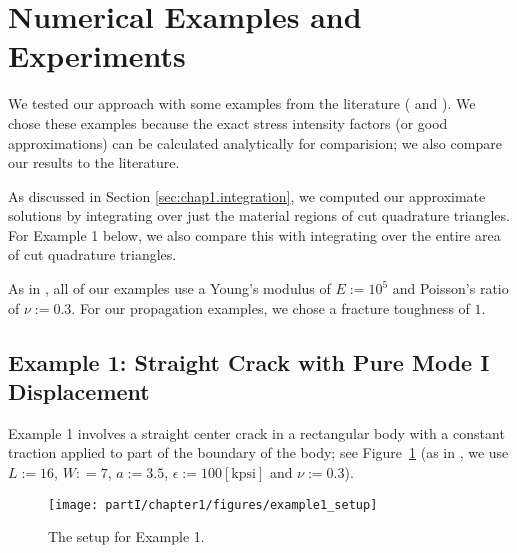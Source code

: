\section{Numerical Examples and Experiments} \label{sec:chap1.examples}

We tested our approach with some examples from the literature 
(\cite{Belytschko99} and \cite{Moes99}). We chose these examples because the exact stress intensity factors (or good approximations) can be calculated analytically for comparision; we also compare our results to the literature.

As discussed in Section \ref{sec:chap1.integration}, we computed our approximate solutions by integrating over just the material regions of cut quadrature triangles. For Example 1 below, we also compare this with integrating over the entire area of cut quadrature triangles.

As in \cite{Moes99}, all of our examples use a Young's modulus of $E := 10^5$ and Poisson's ratio of $\nu := 0.3$. For our propagation examples, we chose a fracture toughness of $1$.

\subsection{Example 1: Straight Crack with Pure Mode I Displacement}

Example 1 involves a straight center crack in a rectangular body with a constant traction applied to part of the boundary of the body; see Figure~\ref{fig:chap1.example1.setup} (as in \cite{Moes99}, we use $L := 16$, $W: = 7$, $a := 3.5$, $\epsilon := 100 [\text{kpsi}]$ and $\nu := 0.3$).

\setlength{\figurewidth}{0.20\textwidth}
\begin{figure}[htbp]
\centering
\texttt{[image: partI/chapter1/figures/example1\_setup]}
\caption{The setup for Example 1.}
\label{fig:chap1.example1.setup}
\end{figure}

